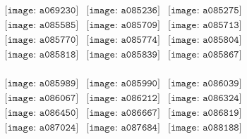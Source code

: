 \documentclass{article}
\begin{document}
        \clearpage
        \begin{figure}[H]
 \begin{center}$
 \begin{array}{cccc}
\texttt{[image: a069230]}&\texttt{[image: a085236]}&\texttt{[image: a085275]}\\\texttt{[image: a085585]}&\texttt{[image: a085709]}&\texttt{[image: a085713]}\\\texttt{[image: a085770]}&\texttt{[image: a085774]}&\texttt{[image: a085804]}\\\texttt{[image: a085818]}&\texttt{[image: a085839]}&\texttt{[image: a085867]}\\
\end{array}$
\end{center}
\end{figure}

\begin{figure}[H]
 \begin{center}$
 \begin{array}{cccc}
\texttt{[image: a085989]}&\texttt{[image: a085990]}&\texttt{[image: a086039]}\\\texttt{[image: a086067]}&\texttt{[image: a086212]}&\texttt{[image: a086324]}\\\texttt{[image: a086450]}&\texttt{[image: a086667]}&\texttt{[image: a086819]}\\\texttt{[image: a087024]}&\texttt{[image: a087684]}&\texttt{[image: a088188]}\\
\end{array}$
\end{center}
\end{figure}
\end{document}
